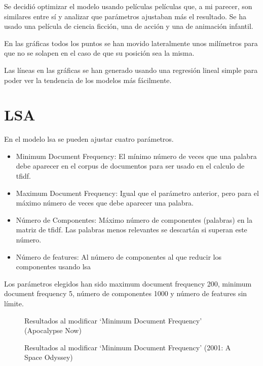 \documentclass[withindex, glossary]{cam-thesis}
\begin{document}
Se decidió optimizar el modelo usando películas películas que, a mi parecer, son similares entre sí y analizar que parámetros ajustaban más el resultado. Se ha usado una película de ciencia ficción, una de acción y una de animación infantil.

En las gráficas todos los puntos se han movido lateralmente unos milímetros para que no se solapen en el caso de que su posición sea la misma.

Las líneas en las gráficas se han generado usando una regresión lineal simple para poder ver la tendencia de los modelos más fácilmente.

\section{LSA}
En el modelo \acrshort{lsa} se pueden ajustar cuatro parámetros.

\begin{itemize}
    \item Minimum Document Frequency: El mínimo número de veces que una palabra debe aparecer en el corpus de documentos para ser usado en el calculo de \acrshort{tfidf}.
    \item Maximum Document Frequency: Igual que el parámetro anterior, pero para el máximo número de veces que debe aparecer una palabra.
    \item Número de Componentes: Máximo número de componentes (palabras) en la matriz de \acrshort{tfidf}. Las palabras menos relevantes se descartán si superan este número.
    \item Número de features: Al número de componentes al que reducir los componentes usando \acrshort{lsa}
\end{itemize}

Los parámetros elegidos han sido maximum document frequency 200, minimum document frequency 5, número de componentes 1000 y número de features sin límite.

\newlength\figureheight
\newlength\figurewidth
\setlength{}
\setlength\figurewidth{\linewidth}
\begin{figure}[!htbp]
    \centering
    
    \caption{Resultados al modificar `Minimum Document Frequency' (Apocalypse Now)}
\end{figure}

\begin{figure}[!htbp]
    \centering
    
    \caption{Resultados al modificar `Minimum Document Frequency' (2001: A Space Odyssey)}
\end{figure}
\end{document}
